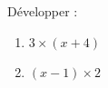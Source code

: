 
\begin{mental}
    Développer :
    \begin{enumerate}
        \item
            \( 3\times (x+4)\)
        \item
            \( (x-1)\times 2\)
    \end{enumerate}
\end{mental}
